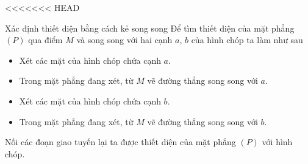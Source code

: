 <<<<<<< HEAD
\begin{dang}{Xác định thiết diện bằng cách kẻ song song}
	Để tìm thiết diện của mặt phẳng $(P)$ qua điểm $M$ và song song với hai cạnh $a$, $b$ của hình chóp ta làm như sau
	\begin{itemize}
		\item Xét các mặt của hình chóp chứa cạnh $a$.
		\item Trong mặt phẳng đang xét, từ $M$ vẽ đường thẳng song song với $a$.
		\item Xét các mặt của hình chóp chứa cạnh $b$.
		\item Trong mặt phẳng đang xét, từ $M$ vẽ đường thẳng song song với $b$.
	\end{itemize}
	Nối các đoạn giao tuyến lại ta được thiết diện của mặt phẳng $(P)$ với hình chóp.
\end{dang}
